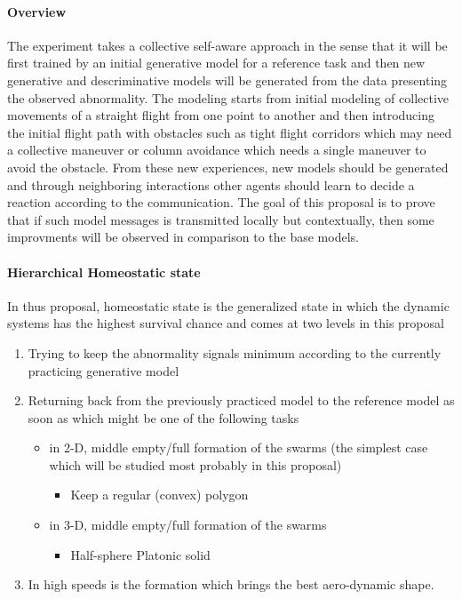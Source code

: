 \documentclass{article}
\begin{document}
		\paragraph{Overview} The experiment takes a collective self-aware approach in the sense that it will be first trained by an initial generative model for a reference task and then new generative and descriminative models will be generated from the data presenting the observed abnormality. The modeling starts from initial modeling of collective movements of a straight flight from one point to another and then introducing the initial flight path with obstacles such as tight flight corridors which may need a collective maneuver or column avoidance which needs a single maneuver to avoid the obstacle. From these new experiences, new models should be generated and through neighboring interactions other agents should learn to decide a reaction according to the communication. The goal of this proposal is to prove that if such model messages is transmitted locally but contextually, then some improvments will be observed in comparison to the base models.   
		
		\paragraph{Hierarchical Homeostatic state} 
			In thus proposal, homeostatic state is the generalized state in which the dynamic systems has the highest survival chance and comes at two levels in this proposal
			\begin{enumerate}
				\item  Trying to keep the abnormality signals minimum according to the currently practicing generative model 
				\item  Returning back from the previously practiced model to the reference model as soon as which might be one of the following tasks
					\begin{itemize}
						\item in 2-D, middle empty/full formation of the swarms (the simplest case which will be studied most probably in this proposal)
						\begin{itemize}
							\item Keep a regular (convex) polygon 
						\end{itemize} 
						\item in 3-D, middle empty/full formation of the swarms
						\begin{itemize}
							\item Half-sphere Platonic solid
						\end{itemize}
					\end{itemize}
				\item In high speeds is the formation which brings the best aero-dynamic shape.
			\end{enumerate}
			
\end{document}
